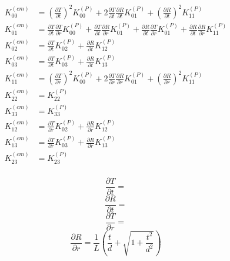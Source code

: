 \documentclass[10pt,letterpaper]{article}
\begin{document}
\begin{align}
K^{(cm)}_{00} &= \left(\frac{\partial T}{\partial t}\right)^2 K^{(P)}_{00} + 2 \frac{\partial T}{\partial t} \frac{\partial R}{\partial t} K^{(P)}_{01} + \left(\frac{\partial R}{\partial t}\right)^2 K^{(P)}_{11}\nonumber\\
K^{(cm)}_{01} &= \frac{\partial T}{\partial t} \frac{\partial T}{\partial r} K^{(P)}_{00}+\frac{\partial T}{\partial t} \frac{\partial R}{\partial r} K^{(P)}_{01}+\frac{\partial R}{\partial t} \frac{\partial T}{\partial r} K^{(P)}_{01}+\frac{\partial R}{\partial t} \frac{\partial R}{\partial r} K^{(P)}_{11} \nonumber\\
K^{(cm)}_{02} &= \frac{\partial T}{\partial t} K^{(P)}_{02}+\frac{\partial R}{\partial t} K^{(P)}_{12} \nonumber\\
K^{(cm)}_{03} &= \frac{\partial T}{\partial t} K^{(P)}_{03}+\frac{\partial R}{\partial t} K^{(P)}_{13} \nonumber\\
K^{(cm)}_{11} &= \left(\frac{\partial T}{\partial r}\right)^2 K^{(P)}_{00}+2 \frac{\partial T}{\partial r} \frac{\partial R}{\partial r} K^{(P)}_{01}+\left(\frac{\partial R}{\partial r}\right)^2 K^{(P)}_{11} \nonumber\\
K^{(cm)}_{22} &= K^{(P)}_{22}\nonumber\\
K^{(cm)}_{33} &= K^{(P)}_{33}\nonumber\\
K^{(cm)}_{12} &= \frac{\partial T}{\partial r} K^{(P)}_{02}+\frac{\partial R}{\partial r} K^{(P)}_{12} \nonumber\\
K^{(cm)}_{13} &= \frac{\partial T}{\partial r} K^{(P)}_{03}+\frac{\partial R}{\partial r} K^{(P)}_{13} \nonumber\\
K^{(cm)}_{23} &= K^{(P)}_{23}\nonumber\\
\end{align}

\begin{equation}
\frac{\partial T}{\partial t}=
\end{equation}
\begin{equation}
\frac{\partial R}{\partial t}=
\end{equation}
\begin{equation}
\frac{\partial T}{\partial r}=
\end{equation}
\begin{equation}
\frac{\partial R}{\partial r}= \frac1L \left( \frac{t}{d} + \sqrt{1+ \frac{t^2}{d^2}}\right)
\end{equation}
\end{document}
